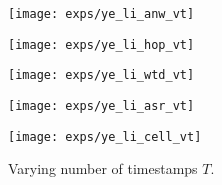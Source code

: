 \documentclass{USC-Thesis}
\numberwithin{equation}{chapter}
\begin{document}
\begin{comment}
\begin{figure}[tbh]
	\begin{minipage}[b]{0.49\linewidth}
	\centering
		\texttt{[image: figures/yelp\_005]}
		\subcaption{KalmanPID, $f = 10\%$}
		\label{fig:yelp_005}
	\end{minipage}
	\begin{minipage}[b]{0.49\linewidth}
	\centering
		\texttt{[image: figures/yelp\_0005]}
		\subcaption{BasicD ($f = 50\%$)}
		\label{fig:yelp_0005}
	\end{minipage}
	\caption{AG Structure visualization for Yelp dataset.}
\label{fig:yelp_gs}
\end{figure}
\end{comment}


\begin{figure*}[tbh]
	\begin{minipage}[b]{0.195\linewidth}
	\centering
		\texttt{[image: exps/ye\_li\_anw\_vt]}
		\label{fig:ye_li_anw_vt}
	\end{minipage}
	\begin{minipage}[b]{0.195\linewidth}
	\centering
		\texttt{[image: exps/ye\_li\_hop\_vt]}
		\label{fig:ye_li_hop_vt}
	\end{minipage}
	\begin{minipage}[b]{0.195\linewidth}
	\centering
		\texttt{[image: exps/ye\_li\_wtd\_vt]}
		\label{fig:ye_li_wtd_vt}
	\end{minipage}	
	\begin{minipage}[b]{0.195\linewidth}
		\centering
		\texttt{[image: exps/ye\_li\_asr\_vt]}
		\label{fig:ye_li_asr_vt}
	\end{minipage}
		\begin{minipage}[b]{0.195\linewidth}
		\centering
		\texttt{[image: exps/ye\_li\_cell\_vt]}
		\label{fig:ye_li_cell_vt}
	\end{minipage}
	\caption{Varying number of timestamps $T$.}
\label{fig:varying_t}
\end{figure*}
\end{document}
